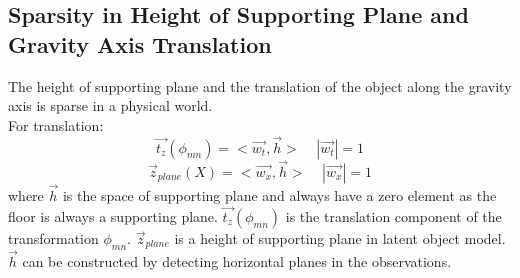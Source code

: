 \subsection{Sparsity in Height of Supporting Plane and Gravity Axis Translation}
The height of supporting plane and the translation of the object along the gravity axis is sparse in a physical world.\\
For translation:
\begin{equation}
\vec{t_z}(\phi_{mn}) = <\vec{w_t},\vec{h}>~~~~~|\vec{w_t}| = 1
\end{equation}
\begin{equation}
\vec{z}_{plane}(X) = <\vec{w_x},\vec{h}>~~~~~|\vec{w_x}| = 1
\end{equation}
where $\vec{h}$ is the space of supporting plane and always have a zero element as the floor is always a supporting plane. $\vec{t_z}(\phi_{mn})$ is the translation component of the transformation $\phi_{mn}$. $\vec{z}_{plane}$ is a height of supporting plane in latent object model. $\vec{h}$ can be constructed by detecting horizontal planes in the observations.

